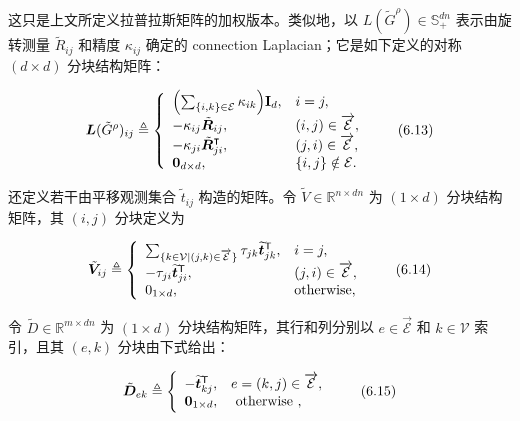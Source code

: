 这只是上文所定义拉普拉斯矩阵的加权版本。类似地，以 $L ( \tilde { G } ^ { \rho } ) \in \mathbb { S } _ { + } ^ { d n }$ 表示由旋转测量 $\tilde { R } _ { i j }$ 和精度 $\kappa _ { i j }$ 确定的 connection Laplacian；它是如下定义的对称 $( d \times d )$ 分块结构矩阵：

\begin{equation}
\boldsymbol {L} (\tilde {G} ^ {\rho}) _ {i j} \triangleq \left\{ \begin{array}{l l} \Bigl (\sum_ {\{i, k \} \in \mathcal {E}} \kappa_ {i k} \Bigr) \mathbf {I} _ {d}, & i = j, \\ - \kappa_ {i j} \tilde {\boldsymbol {R}} _ {i j}, & (i, j) \in \overrightarrow {\mathcal {E}}, \\ - \kappa_ {j i} \tilde {\boldsymbol {R}} _ {j i} ^ {\intercal}, & (j, i) \in \overrightarrow {\mathcal {E}}, \\ \mathbf {0} _ {d \times d}, & \{i, j\} \notin \mathcal {E}. \end{array} \right.\tag{6.13}
\end{equation}

还定义若干由平移观测集合 $\tilde { t } _ { i j }$ 构造的矩阵。令 $\tilde { V } \in \mathbb { R } ^ { n \times d n }$ 为 $( 1 \times d )$ 分块结构矩阵，其 $( i , j )$ 分块定义为

\begin{equation}
\tilde {\boldsymbol {V}} _ {i j} \triangleq \left\{ \begin{array}{l l} \sum_ {\{k \in \mathcal {V} | (j, k) \in \overrightarrow {\mathcal {E}} \}} \tau_ {j k} \widetilde {\boldsymbol {t}} _ {j k} ^ {\mathsf {T}}, & i = j, \\ - \tau_ {j i} \widetilde {\boldsymbol {t}} _ {j i} ^ {\mathsf {T}}, & (j, i) \in \overrightarrow {\mathcal {E}}, \\ 0 _ {1 \times d}, & \text {otherwise}, \end{array} \right.\tag{6.14}
\end{equation}

令 $\tilde { D } \in \mathbb { R } ^ { m \times d n }$ 为 $( 1 \times d )$ 分块结构矩阵，其行和列分别以 $e \in { \vec { \mathcal { E } } }$ 和 $k \in \mathcal{V}$ 索引，且其 $( e , k )$ 分块由下式给出：

\begin{equation}
\tilde {\boldsymbol {D}} _ {e k} \triangleq \left\{ \begin{array}{l l} - \widetilde {\boldsymbol {t}} _ {k j} ^ {\mathsf {T}}, & e = (k, j) \in \overrightarrow {\mathcal {E}}, \\ \boldsymbol {0} _ {1 \times d}, & \text { otherwise }, \end{array} \right.\tag{6.15}
\end{equation}

